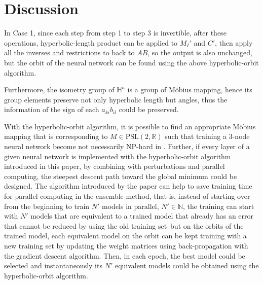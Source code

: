 \documentclass{article}
\theoremstyle{plain}
\theoremstyle{plain} %
\theoremstyle{definition}  %
\theoremstyle{remark}  %
\theoremstyle{plain}
\begin{document}




\section{Discussion}
In Case 1, since each step from step 1 to step 3 is invertible, after these operations, hyperbolic-length product can be applied to $M_I'$ and $C'$, then apply all the inverses and restrictions to back to $AB$, so the output is also unchanged, but the orbit of the neural network can be found using the above hyperbolic-orbit algorithm. 

Furthermore, the isometry group of $\mathbb{H}^n$ is a group of M\"{o}bius mapping, hence its group elements preserve not only hyperbolic length but angles, thus the information of the sign of each $a_{ki}b_{il}$ could be preserved.

With the hyperbolic-orbit algorithm, it is possible to find an appropriate M\"{o}bius mapping that is corresponding to $M\in\text{PSL}(2,\mathbb{R})$ such that training a 3-node neural network become not necessarily NP-hard in \cite{blum1988training}. Further, if every layer of a given neural network is implemented with the hyperbolic-orbit algorithm introduced in this paper, by combining with perturbations and parallel computing, the steepest descent path toward the global minimum could be designed. The algorithm introduced by the paper can help to save training time for parallel computing in the ensemble method, that is, instead of starting over from the beginning to train $N'$ models in parallel, $N'\in\mathbb{N}$, the training can start with $N'$ models that are equivalent to a trained model that already has an error that cannot be reduced by using the old training set--but on the orbits of the trained model, each equivalent model on the orbit can be kept training with a new training set by updating the weight matrices using back-propagation with the gradient descent algorithm. Then, in each epoch, the best model could be selected and instantaneously its $N'$ equivalent models could be obtained using the hyperbolic-orbit algorithm.
\end{document}
